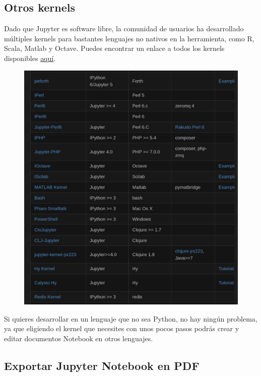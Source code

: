\documentclass[11pt]{article}
\makeatletter
\def\maxwidth{\ifdim\Gin@nat@width>\linewidth\linewidth
    \else\Gin@nat@width\fi}
\let\Oldincludegraphics\includegraphics
\renewcommand{\includegraphics}[1]{\Oldincludegraphics[width=.8\maxwidth]{#1}}
\makeatother
\begin{document}
    \subsection{Otros kernels}\label{otros-kernels}

    Dado que Jupyter es software libre, la comunidad de usuarios ha
desarrollado múltiples kernels para bastantes lenguajes no nativos en la
herramienta, como R, Scala, Matlab y Octave. Puedes encontrar un enlace
a todos los kernels disponibles
\href{https://github.com/jupyter/jupyter/wiki/Jupyter-kernels}{aquí}.

    \begin{figure}
\centering
\includegraphics{kernel-list.png}
\caption{}
\end{figure}

    Si quieres desarrollar en un lenguaje que no sea Python, no hay ningún
problema, ya que eligiendo el kernel que necesites con unos pocos pasos
podrás crear y editar documentos Notebook en otros lenguajes.

    \subsection{Exportar Jupyter Notebook en
PDF}\label{exportar-jupyter-notebook-en-pdf}
\end{document}

